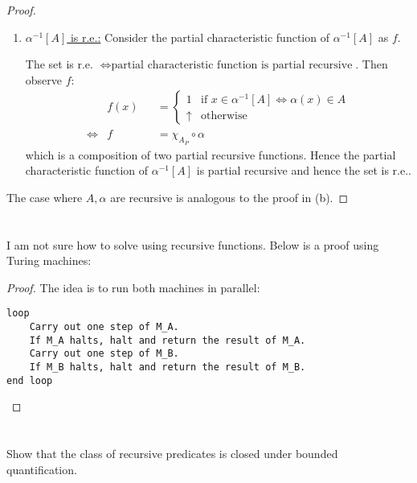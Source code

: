 \documentclass{article}
\theoremstyle{plain}
\newcommand{\N}{\mathbb{N}}
\begin{document}
\begin{enumerate}
{\begin{proof}
\begin{enumerate}
{          Find $\varphi_{e}$ such that $\varphi_{e}[\N] = A$. Then
          \[\alpha[A] = \alpha\circ\varphi_{e}[\N]\]
          gives us $\alpha[A]$ as a range of a partial recursive function $\alpha\circ\varphi_{e}$,
          therefore $\alpha[A]$ is r.e..}

        \item { \underline{$\alpha^{-1}[A]$ is r.e.:} Consider the partial
          characteristic function of $\alpha^{-1}[A]$ as $f$.

          The set is r.e. $\iff \text{partial characteristic function is
            partial recursive}$. Then observe $f$:
          \begin{align*}
            &f(x)&&=\begin{cases}
              1 &\text{if }x\in\alpha^{-1}[A] \iff \alpha(x)\in A\\
              \uparrow &\text{otherwise}
            \end{cases}\\
            \iff &f &&= \chi_{A_{P}}\circ\alpha
          \end{align*} which is a composition of two partial recursive
          functions. Hence the partial characteristic function of $\alpha^{-1}[A]$ is
          partial recursive and hence the set is r.e..
        }
      \end{enumerate}
      The case where $A, \alpha$ are recursive is analogous to the proof in (b).
    \end{proof}
  }
\end{enumerate}

\section{}
\subsubsection{}
I am not sure how to solve using recursive functions. Below is a proof using
Turing machines:
\begin{proof}The idea is to run both machines in parallel:
 \begin{verbatim}
loop
    Carry out one step of M_A.
    If M_A halts, halt and return the result of M_A.
    Carry out one step of M_B.
    If M_B halts, halt and return the result of M_B.
end loop
\end{verbatim}
\end{proof}

\section{}
Show that the class of recursive predicates is closed under bounded quantification.
\end{document}
